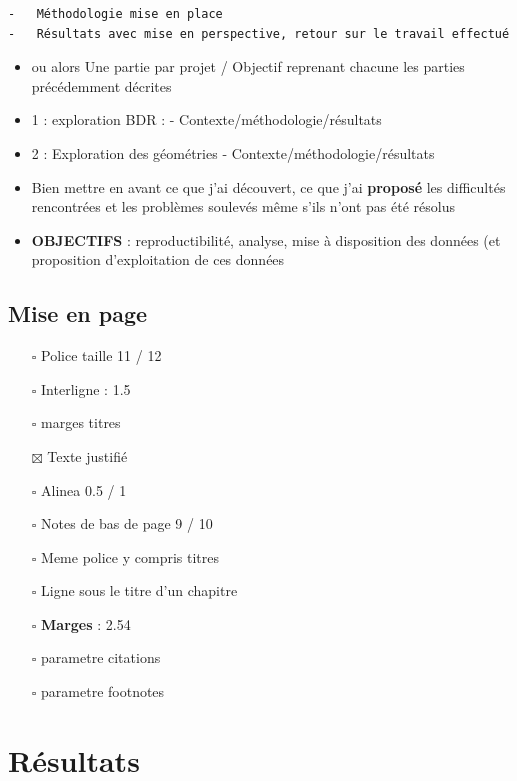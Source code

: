 \documentclass[
  a4paper,
]{scrbook}
\begin{document}
\begin{verbatim}
-   Méthodologie mise en place
-   Résultats avec mise en perspective, retour sur le travail effectué
\end{verbatim}

\begin{itemize}
\item
  ou alors Une partie par projet / Objectif reprenant chacune les
  parties précédemment décrites
\item
  1 : exploration BDR : - Contexte/méthodologie/résultats
\item
  2 : Exploration des géométries - Contexte/méthodologie/résultats
\item
  Bien mettre en avant ce que j'ai découvert, ce que j'ai
  \textbf{proposé} les difficultés rencontrées et les problèmes soulevés
  même s'ils n'ont pas été résolus
\item
  \textbf{OBJECTIFS} : reproductibilité, analyse, mise à disposition des
  données (et proposition d'exploitation de ces données
\end{itemize}

\hypertarget{mise-en-page}{%
\section{Mise en page}\label{mise-en-page}}

\begin{itemize}
\item[$\square$]
  Police taille 11 / 12
\item[$\square$]
  Interligne : 1.5
\item[$\square$]
  marges titres
\item[$\boxtimes$]
  Texte justifié
\item[$\square$]
  Alinea 0.5 / 1
\item[$\square$]
  Notes de bas de page 9 / 10
\item[$\square$]
  Meme police y compris titres
\item[$\square$]
  Ligne sous le titre d'un chapitre
\item[$\square$]
  \textbf{Marges} : 2.54
\item[$\square$]
  parametre citations
\item[$\square$]
  parametre footnotes
\end{itemize}

\hypertarget{ruxe9sultats}{%
\chapter{Résultats}\label{ruxe9sultats}}
\end{document}

